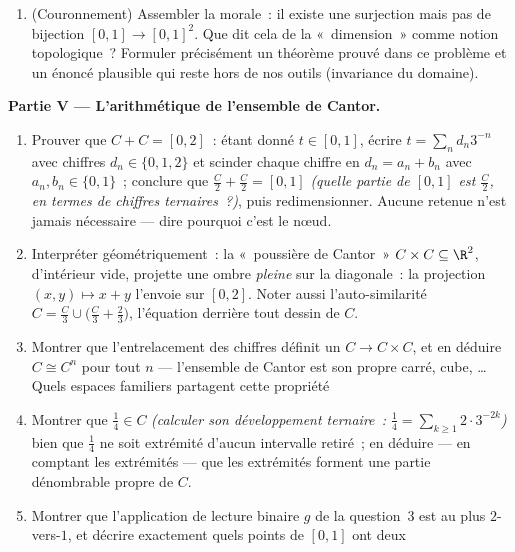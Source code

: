 \begin{problem}
\begin{enumerate}[resume]
        dans l'argument~
  \item (Couronnement) Assembler la morale~: il existe une
        surjection  mais pas de bijection 
        $[0,1] \to [0,1]^2$. Que dit cela de la «~dimension~»
        comme notion topologique~? Formuler précisément un
        théorème prouvé dans ce problème et un énoncé
        plausible qui reste hors de nos outils (invariance du
        domaine).
\end{enumerate}
\medskip
\noindent\textbf{Partie V --- L'arithmétique de l'ensemble de
Cantor.}
\begin{enumerate}[resume]
  \item Prouver que $C + C = [0, 2]$~: étant donné $t \in [0,
        1]$, écrire $t = \sum_n d_n3^{-n}$ avec chiffres $d_n
        \in \{0, 1, 2\}$ et scinder chaque chiffre en $d_n =
        a_n + b_n$ avec $a_n, b_n \in \{0, 1\}$~; conclure que
        $\frac C2 + \frac C2 = [0, 1]$ \emph{(quelle partie de
        $[0,1]$ est $\frac C2$, en termes de chiffres
        ternaires~?)}, puis redimensionner. Aucune retenue
        n'est jamais nécessaire --- dire pourquoi c'est le
        nœud.
  \item Interpréter géométriquement~: la «~poussière de
        Cantor~» $C \times C \subseteq \R^2$, d'intérieur vide,
        projette une ombre \emph{pleine} sur la diagonale~: la
        projection $(x, y) \mapsto x + y$ l'envoie sur $[0,
        2]$. Noter aussi l'auto-similarité $C = \frac C3 \cup
        \bigl(\frac C3 + \frac23\bigr)$, l'équation derrière
        tout dessin de $C$.
  \item Montrer que l'entrelacement des chiffres définit un
         $C \to C \times C$, et en déduire $C
        \cong C^n$ pour tout $n$ --- l'ensemble de Cantor est
        son propre carré, cube, \dots{} Quels espaces familiers
        partagent cette propriété~
  \item Montrer que $\frac14 \in C$ \emph{(calculer son
        développement ternaire~: $\frac14 = \sum_{k\geq1}
        2\cdot3^{-2k}$)} bien que $\frac14$ ne soit extrémité
        d'aucun intervalle retiré~; en déduire --- en comptant
        les extrémités --- que les extrémités forment une
        partie dénombrable propre de $C$.
  \item Montrer que l'application de lecture binaire $g$ de la
        question~3 est au plus $2$-vers-$1$, et décrire
        exactement quels points de $[0,1]$ ont deux

\end{enumerate}
\end{problem}
